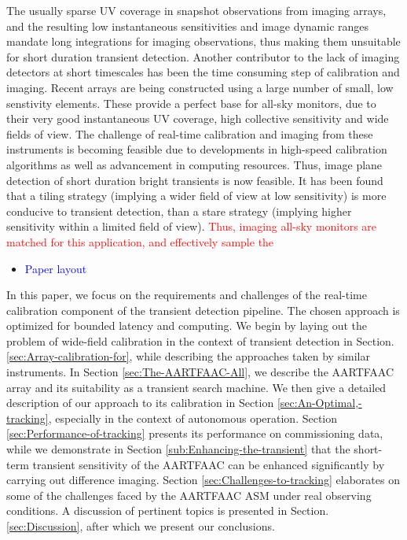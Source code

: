 \documentclass{aa}
\begin{document}
The usually sparse UV coverage in snapshot observations from imaging
arrays, and the resulting low instantaneous sensitivities and image
dynamic ranges mandate long integrations for imaging observations,
thus making them unsuitable for short duration transient detection.
Another contributor to the lack of imaging detectors at short timescales
has been the time consuming step of calibration and imaging. Recent
arrays are being constructed using a large number of small, low senstivity
elements. These provide a perfect base for all-sky monitors, due to
their very good instantaneous UV coverage, high collective sensitivity
and wide fields of view. The challenge of real-time calibration and
imaging from these instruments is becoming feasible due to developments
in high-speed calibration algorithms as well as advancement in computing
resources. Thus, image plane detection of short duration bright transients
is now feasible. It has been found that a tiling strategy (implying
a wider field of view at low sensitivity) is more conducive to transient
detection, than a stare strategy (implying higher sensitivity within
a limited field of view)\cite{nemiroff2003tile}. \textcolor{red}{Thus,
imaging all-sky monitors are matched for this application, and effectively
sample the }
\begin{itemize}
\item \textcolor{blue}{Paper layout}
\end{itemize}
In this paper, we focus on the requirements and challenges of the
real-time calibration component of the transient detection pipeline.
The chosen approach is optimized for bounded latency and computing.
We begin by laying out the problem of wide-field calibration in the
context of transient detection in Section. \ref{sec:Array-calibration-for},
while describing the approaches taken by similar instruments. In Section
\ref{sec:The-AARTFAAC-All}, we describe the AARTFAAC array and its
suitability as a transient search machine. We then give a detailed
description of our approach to its calibration in Section \ref{sec:An-Optimal,-tracking},
especially in the context of autonomous operation. Section \ref{sec:Performance-of-tracking}
presents its performance on commissioning data, while we demonstrate
in Section \ref{sub:Enhancing-the-transient} that the short-term
transient sensitivity of the AARTFAAC can be enhanced significantly
by carrying out difference imaging. Section \ref{sec:Challenges-to-tracking}
elaborates on some of the challenges faced by the AARTFAAC ASM under
real observing conditions. A discussion of pertinent topics is presented
in Section. \ref{sec:Discussion}, after which we present our conclusions.
\end{document}
